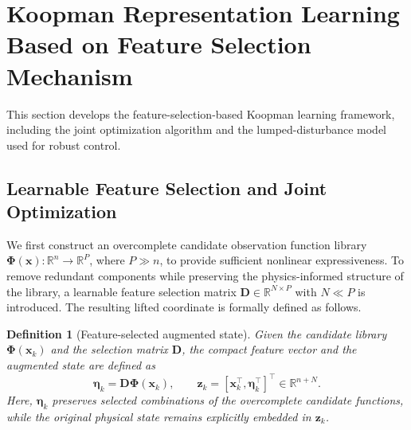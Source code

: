 \documentclass[final,3p,twocolumn,times]{elsarticle}
\newtheorem{definition}{Definition}[section]
\newcommand{\R}{\mathbb{R}}
\newcommand{\x}{\mathbf{x}}
\newcommand{\z}{\mathbf{z}}
\newcommand{\Dmat}{\mathbf{D}}
\newcommand{\Phib}{\boldsymbol{\Phi}}
\begin{document}
\section{Koopman Representation Learning Based on Feature Selection Mechanism}
\label{sec:koopman}

This section develops the feature-selection-based Koopman learning framework, including the joint optimization algorithm and the lumped-disturbance model used for robust control.

\subsection{Learnable Feature Selection and Joint Optimization}
\label{subsec:algorithm}
We first construct an overcomplete candidate observation function library $\Phib(\x):\R^n\to\R^P$, where $P\gg n$, to provide sufficient nonlinear expressiveness. To remove redundant components while preserving the physics-informed structure of the library, a learnable feature selection matrix $\Dmat\in\R^{N\times P}$ with $N\ll P$ is introduced. The resulting lifted coordinate is formally defined as follows.

{
\begin{definition}[Feature-selected augmented state]
Given the candidate library $\Phib(\x_k)$ and the selection matrix $\Dmat$, the compact feature vector and the augmented state are defined as
\begin{equation}
\boldsymbol{\eta}_k = \Dmat\Phib(\x_k), \qquad
\z_k = [\x_k^\top, \boldsymbol{\eta}_k^\top]^\top \in \R^{n+N}.
\end{equation}
Here, $\boldsymbol{\eta}_k$ preserves selected combinations of the overcomplete candidate functions, while the original physical state remains explicitly embedded in $\z_k$.
\end{definition}
}
\end{document}

